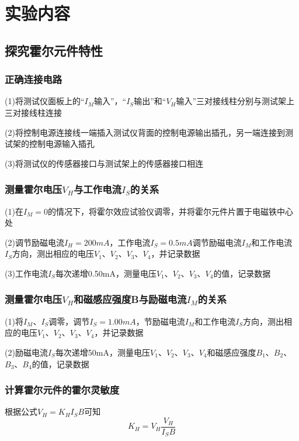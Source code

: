 \documentclass[12pt,a4paper]{article}
\newcommand*{\song}{\CJKfamily{zhsong}}
\newcommand{\sectionfont}{\song\textbf}
\begin{document}
\section{\sectionfont 实验内容}
    \subsection{探究霍尔元件特性}
        \subsubsection{正确连接电路}
        (1)将测试仪面板上的“$I_M$输入”，“$I_S$输出”和“$V_H$输入”三对接线柱分别与测试架上三对接线柱连接\par
        (2)将控制电源连接线一端插入测试仪背面的控制电源输出插孔，另一端连接到测试架的控制电源输入插孔\par
        (3)将测试仪的传感器接口与测试架上的传感器接口相连

        \subsubsection{测量霍尔电压$V_H$与工作电流$I_S$的关系}
        (1)在$I_M=0$的情况下，将霍尔效应试验仪调零，并将霍尔元件片置于电磁铁中心处\par
        (2)调节励磁电流$I_H=200mA$，工作电流$I_S=0.5mA$调节励磁电流$I_M$和工作电流$I_S$方向，测出相应的电压$V_1$、$V_2$、$V_3$、$V_4$，并记录数据\par
        (3)工作电流$I_S$每次递增0.50mA，测量电压$V_1$、$V_2$、$V_3$、$V_4$的值，记录数据\par

        \subsubsection{测量霍尔电压$V_H$和磁感应强度B与励磁电流$I_M$的关系}
        (1)将$I_M$、$I_S$调零，调节$I_S=1.00mA$，节励磁电流$I_M$和工作电流$I_S$方向，测出相应的电压$V_1$、$V_2$、$V_3$、$V_4$，并记录数据\par
        (2)励磁电流$I_S$每次递增50mA，测量电压$V_1$、$V_2$、$V_3$、$V_4$和磁感应强度$B_1$、$B_2$、$B_3$、$B_4$的值，记录数据\par

        \subsubsection{计算霍尔元件的霍尔灵敏度}
        根据公式$V_H={K_H}{I_S}B$可知
        \[K_H={V_H}\frac{V_H}{{I_S}B}\]
\end{document}
